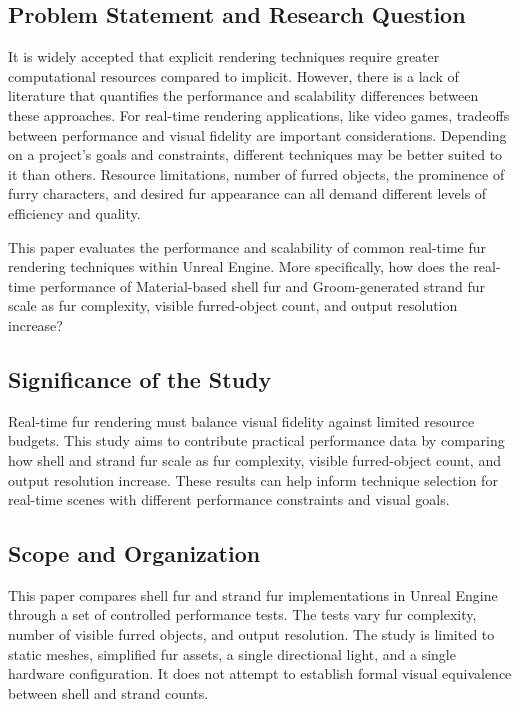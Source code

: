 \documentclass{article}
\begin{document}
\subsection{Problem Statement and Research Question}

It is widely accepted that explicit rendering techniques require greater computational resources compared to implicit. However, there is a lack of literature that quantifies the performance and scalability differences between these approaches. For real-time rendering applications, like video games, tradeoffs between performance and visual fidelity are important considerations. Depending on a project's goals and constraints, different techniques may be better suited to it than others. Resource limitations, number of furred objects, the prominence of furry characters, and desired fur appearance can all demand different levels of efficiency and quality.

This paper evaluates the performance and scalability of common real-time fur rendering techniques within Unreal Engine. More specifically, how does the real-time performance of Material-based shell fur and Groom-generated strand fur scale as fur complexity, visible furred-object count, and output resolution increase?

\subsection{Significance of the Study}

Real-time fur rendering must balance visual fidelity against limited resource budgets. This study aims to contribute practical performance data by comparing how shell and strand fur scale as fur complexity, visible furred-object count, and output resolution increase. These results can help inform technique selection for real-time scenes with different performance constraints and visual goals.

\subsection{Scope and Organization}

This paper compares shell fur and strand fur implementations in Unreal Engine through a set of controlled performance tests. The tests vary fur complexity, number of visible furred objects, and output resolution. The study is limited to static meshes, simplified fur assets, a single directional light, and a single hardware configuration. It does not attempt to establish formal visual equivalence between shell and strand counts.
\end{document}

